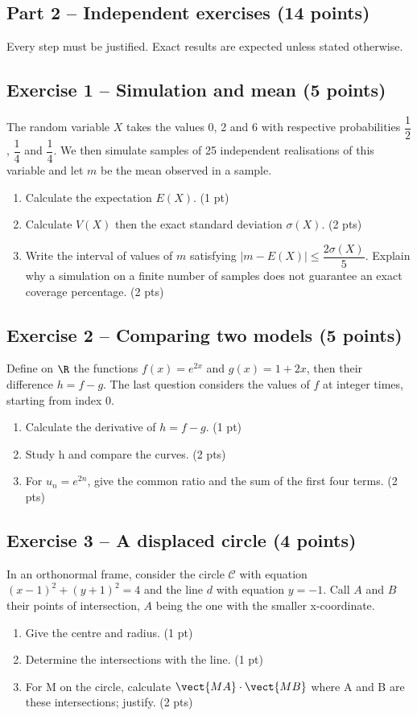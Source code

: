 \clearpage\subsection*{Part 2 -- Independent exercises (14 points)}
Every step must be justified. Exact results are expected unless stated otherwise.
\subsection*{Exercise 1 -- Simulation and mean (5 points)}
The random variable $X$ takes the values 0, 2 and 6 with respective probabilities $\dfrac12$, $\dfrac14$ and $\dfrac14$. We then simulate samples of 25 independent realisations of this variable and let $m$ be the mean observed in a sample.
\begin{enumerate}
\item Calculate the expectation $E(X)$. \hfill(1 pt)
\item Calculate $V(X)$ then the exact standard deviation $\sigma(X)$. \hfill(2 pts)
\item Write the interval of values of $m$ satisfying $|m-E(X)|\leq\dfrac{2\sigma(X)}5$. Explain why a simulation on a finite number of samples does not guarantee an exact coverage percentage. \hfill(2 pts)
\end{enumerate}
\subsection*{Exercise 2 -- Comparing two models (5 points)}
Define on $\R$ the functions $f(x)=e^{2x}$ and $g(x)=1+2x$, then their difference $h=f-g$. The last question considers the values of $f$ at integer times, starting from index 0.
\begin{enumerate}
\item Calculate the derivative of $h=f-g$. \hfill(1 pt)
\item Study h and compare the curves. \hfill(2 pts)
\item For $u_n=e^{2n}$, give the common ratio and the sum of the first four terms. \hfill(2 pts)
\end{enumerate}
\subsection*{Exercise 3 -- A displaced circle (4 points)}
In an orthonormal frame, consider the circle $\mathcal C$ with equation $(x-1)^2+(y+1)^2=4$ and the line $d$ with equation $y=-1$. Call $A$ and $B$ their points of intersection, $A$ being the one with the smaller x-coordinate.
\begin{enumerate}
\item Give the centre and radius. \hfill(1 pt)
\item Determine the intersections with the line. \hfill(1 pt)
\item For M on the circle, calculate $\vect{MA}\cdot\vect{MB}$ where A and B are these intersections; justify. \hfill(2 pts)
\end{enumerate}
